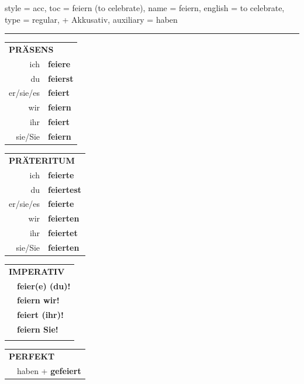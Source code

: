 \begin{verbentry}{
  style = {acc},
  toc = {feiern (to celebrate)},
  name = {feiern},
  english = {to celebrate},
  type = {regular, + Akkusativ},
  auxiliary = {haben}
}
 
    
     \vspace{5pt}

    \hrule
    
    \vspace{5pt}

  \begin{tabular}{rl}
     \multicolumn{2}{l}{\textbf{PRÄSENS} }\\
    ich & \textbf{feiere}\\
    du & \textbf{feierst}\\
    er/sie/es & \textbf{feiert}\\
    wir & \textbf{feiern}\\
    ihr & \textbf{feiert}\\
    sie/Sie & \textbf{feiern}\\
  \end{tabular}
  \hfill
     \begin{tabular}{rl}
    \multicolumn{2}{l}{\textbf{PRÄTERITUM} }\\
    ich & \textbf{feierte}\\
    du & \textbf{feiertest}\\
    er/sie/es & \textbf{feierte}\\
    wir & \textbf{feierten}\\
    ihr & \textbf{feiertet}\\
    sie/Sie & \textbf{feierten}\\
  \end{tabular}
  \hfill
  \begin{tabular}{rl}
     \multicolumn{2}{l}{\textbf{IMPERATIV} }\\
   & \textbf{feier(e) (du)!}\\
   & \textbf{feiern wir!}\\
   & \textbf{feiert (ihr)!}\\
   & \textbf{feiern Sie!}\\
   & \vspace{10pt}
  \end{tabular}

    \vspace{10pt}

 \begin{tabular}{rl}
     \multicolumn{2}{l}{\textbf{PERFEKT}}\\
 &   haben + \textbf{gefeiert}\\
  \end{tabular}
\hfill
   \begin{tabular}{rl}
   

\end{tabular}
\end{verbentry}
